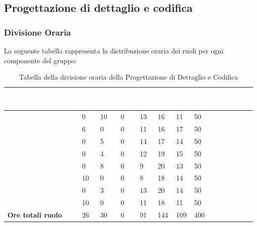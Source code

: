 \subsection{Progettazione di dettaglio e codifica}

\subsubsection{Divisione Oraria}
La seguente tabella rappresenta la distribuzione oraria dei ruoli per ogni componente del gruppo:
{
\renewcommand{\arraystretch}{2}
\begin{longtable}[h!] { C{4cm} C{1cm} C{1cm} C{1cm} C{1cm} C{1cm} C{1cm} C{3cm}}
\caption{Tabella della divisione oraria della Progettazione di Dettaglio e Codifica}\\

\textcolor{white}{\textbf{Membro del gruppo}} & 
\textcolor{white}{\textbf{RE}} & 
\textcolor{white}{\textbf{AM}} & 
\textcolor{white}{\textbf{AN}} & 
\textcolor{white}{\textbf{PT}} & 
\textcolor{white}{\textbf{PR}} & 
\textcolor{white}{\textbf{VE}} & 
\textcolor{white}{\textbf{Ore complessive}}\\
\endhead

\MC{}                     &  0 & 10 & 0 & 13 &  16 &  11 &  50 \\
\LD{}                     &  6 &  0 & 0 & 11 &  16 &  17 &  50 \\
\CE{}                     &  0 &  5 & 0 & 14 &  17 &  14 &  50 \\
\SE{}                     &  0 &  4 & 0 & 12 &  19 &  15 &  50 \\
\PF{}                     &  0 &  8 & 0 &  9 &  20 &  13 &  50 \\
\DF{}                     & 10 &  0 & 0 &  8 &  18 &  14 &  50 \\
\BR{}                     &  0 &  3 & 0 & 13 &  20 &  14 &  50 \\
\AT{}                     & 10 &  0 & 0 & 11 &  18 &  11 &  50 \\
\textbf{Ore totali ruolo} & 26 & 30 & 0 & 91 & 144 & 109 & 400 \\

\end{longtable}
}

